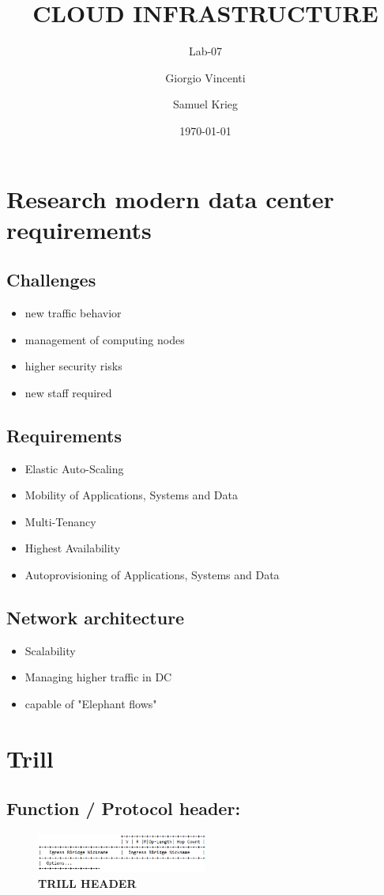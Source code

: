 \documentclass[a4,12pt]{scrartcl}
\title{CLOUD INFRASTRUCTURE}
\subtitle{Lab-07}
\author{Giorgio Vincenti \and Samuel Krieg}
\date{\today}
\begin{document}
\clearpage\maketitle
\thispagestyle{empty}
\tableofcontents
\newpage

\section{Research modern data center requirements}
\subsection{Challenges}
\begin{itemize}
\item new traffic behavior
\item management of computing nodes
\item higher security risks
\item new staff required
\end{itemize}

\subsection{Requirements}
\begin{itemize}
\item Elastic Auto-Scaling
\item Mobility of Applications, Systems and Data
\item Multi-Tenancy
\item Highest Availability
\item Autoprovisioning of Applications, Systems and Data
\end{itemize}

\subsection{Network architecture}
\begin{itemize}
\item Scalability
\item Managing higher traffic in DC
\item capable of "Elephant flows"
\end{itemize}

\section{Trill}
\subsection{Function / Protocol header:} 
\begin{figure} [H]
	\begin{center}
	\includegraphics[width=0.50\textwidth]{./pictures/trill_header.png}
	\caption{\textbf{TRILL HEADER}}
	\label{http://www.ietf.org/mail-archive/web/trill/current/pngiL5ECU_mwA.png}
	\end{center}
\end{figure}
\end{document}
